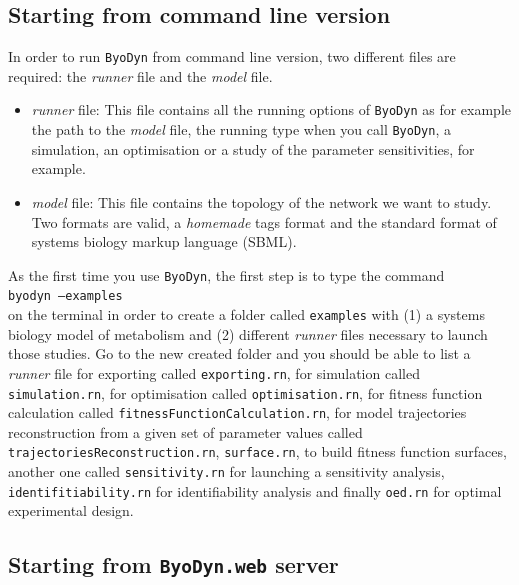 \documentclass[a4paper, 11pt]{article}
\begin{document}
  \subsection{Starting from command line version}
  In order to run \texttt{ByoDyn} from command line version, two different files are required: the \emph{runner} file and the \emph{model} file.
  \begin{itemize}
    \item
      \emph{runner} file: This file contains all the running options of \texttt{ByoDyn} as for example the path to the \emph{model} file, the running type when you call \texttt{ByoDyn}, a simulation, an optimisation or a study of the parameter sensitivities, for example.
    \item
      \emph{model} file: This file contains the topology of the network we want to study. Two formats are valid, a \emph{homemade} tags format and the standard format of systems biology markup language (SBML).
  \end{itemize}
  As the first time you use \texttt{ByoDyn}, the first step is to type the command\\[.5cm]
  \texttt{byodyn --examples}\\[.5cm]
  on the terminal in order to create a folder called \texttt{examples} with (1)
  a systems biology model of metabolism and (2) different \emph{runner} files
  necessary to launch those studies. Go to the new created folder and you should be able to list a \emph{runner} file for exporting called \texttt{exporting.rn}, for simulation called \texttt{simulation.rn}, for optimisation called \texttt{optimisation.rn}, for fitness function calculation called \texttt{fitnessFunctionCalculation.rn}, for model trajectories reconstruction from a given set of parameter values called \texttt{trajectoriesReconstruction.rn}, \texttt{surface.rn}, to build fitness function surfaces, another one called \texttt{sensitivity.rn} for launching a sensitivity analysis, \texttt{identifitiability.rn} for identifiability analysis and finally \texttt{oed.rn} for optimal experimental design.
  \subsection{Starting from \texttt{ByoDyn.web} server}
\end{document}
